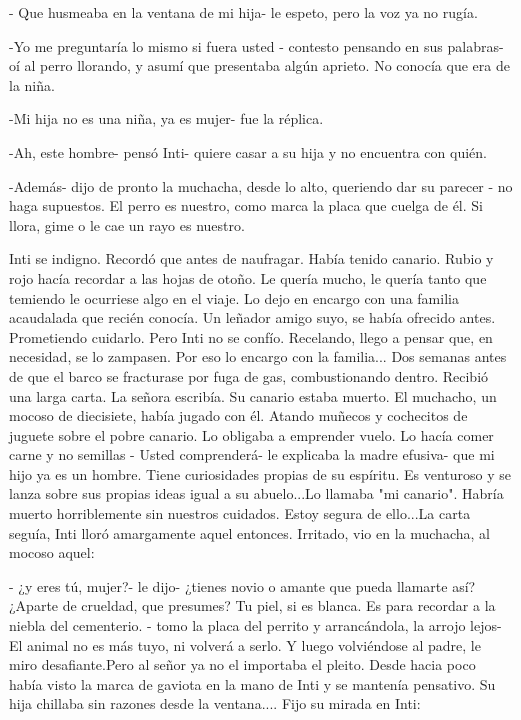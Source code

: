 - Que husmeaba en la ventana de mi hija- le espeto, pero la voz ya no rugía.

-Yo me preguntaría lo mismo si fuera usted - contesto pensando en sus palabras- oí al perro llorando, y asumí que presentaba algún aprieto. No conocía que era de la niña.

-Mi hija no es una niña, ya es mujer- fue la réplica.

-Ah, este hombre- pensó Inti- quiere casar a su hija y no encuentra con quién.

-Además- dijo de pronto la muchacha, desde lo alto, queriendo dar su parecer - no haga supuestos. El perro es nuestro, como marca la placa que cuelga de él. Si llora, gime o le cae un rayo es nuestro.

Inti se indigno. Recordó que antes de naufragar. Había tenido canario. Rubio y rojo hacía recordar a las hojas de otoño. Le quería mucho, le quería tanto que temiendo le ocurriese algo en el viaje. Lo dejo en encargo con una familia acaudalada que recién conocía. Un leñador amigo suyo, se había ofrecido antes. Prometiendo cuidarlo. Pero Inti no se confío. Recelando, llego a pensar que, en necesidad, se lo zampasen. Por eso lo encargo con la familia... Dos semanas antes de que el barco se fracturase por fuga de gas, combustionando dentro. Recibió una larga carta. La señora escribía. Su canario estaba muerto. El muchacho, un mocoso de diecisiete, había jugado con él. Atando muñecos y cochecitos de juguete sobre el pobre canario. Lo obligaba a emprender vuelo. Lo hacía comer carne y no semillas - Usted comprenderá- le explicaba la madre efusiva- que mi hijo ya es un hombre. Tiene curiosidades propias de su espíritu. Es venturoso y se lanza sobre sus propias ideas igual a su abuelo...Lo llamaba "mi canario". Habría muerto horriblemente sin nuestros cuidados. Estoy segura de ello...La carta seguía, Inti lloró amargamente aquel entonces. Irritado, vio en la muchacha, al mocoso aquel:

- ¿y eres tú, mujer?- le dijo- ¿tienes novio o amante que pueda llamarte así? ¿Aparte de crueldad, que presumes? Tu piel, si es blanca. Es para recordar a la niebla del cementerio. - tomo la placa del perrito y arrancándola, la arrojo lejos- El animal no es más tuyo, ni volverá a serlo. Y luego volviéndose al padre, le miro desafiante.Pero al señor ya no el importaba el pleito. Desde hacia poco había visto la marca de gaviota en la mano de Inti y se mantenía pensativo. Su hija chillaba sin razones desde la ventana.... Fijo su mirada en Inti:

